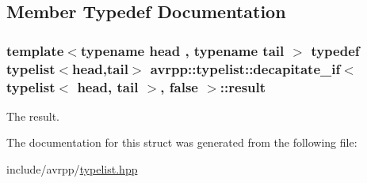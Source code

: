 \subsection{Member Typedef Documentation}
\hypertarget{structavrpp_1_1typelist_1_1decapitate__if_3_01typelist_3_01head_00_01tail_01_4_00_01false_01_4_aadbfa08a69cad1e2e1bbbfbe1b4206fb}{
\subsubsection[{result}]{\setlength{\rightskip}{0pt plus 5cm}template$<$typename head , typename tail $>$ typedef {\bf typelist}$<$head,tail$>$ avrpp::typelist::decapitate\_\-if$<$ {\bf typelist}$<$ head, tail $>$, false $>$::{\bf result}}}
\label{structavrpp_1_1typelist_1_1decapitate__if_3_01typelist_3_01head_00_01tail_01_4_00_01false_01_4_aadbfa08a69cad1e2e1bbbfbe1b4206fb}


The result. 



The documentation for this struct was generated from the following file:\begin{DoxyCompactItemize}
\item 
include/avrpp/\hyperlink{typelist_8hpp}{typelist.hpp}\end{DoxyCompactItemize}
